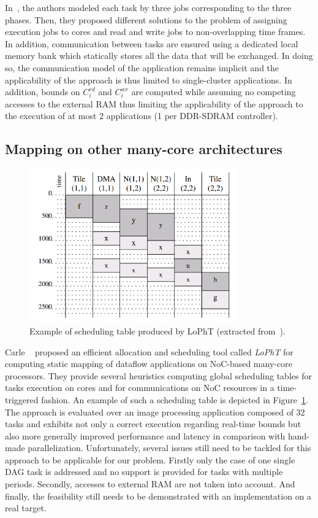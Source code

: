 \documentclass[main.tex]{subfiles}
\begin{document}
In~\cite{Becker16}, the authors modeled each task by three jobs corresponding
to the three phases. Then, they proposed different solutions to the problem of
assigning execution jobs to cores and read and write jobs to non-overlapping
time frames. In addition, communication between tasks are ensured using a
dedicated local memory bank which statically stores all the data that will be
exchanged. In doing so, the communication model of the application remains
implicit and the  applicability of the approach is thus limited to
single-cluster applications. In addition, bounds on $C_i^{rd}$ and $C_i^{wr}$
are computed while assuming no competing accesses to the external RAM thus
limiting the applicability of the approach to the execution of at most 2
applications (1 per DDR-SDRAM controller). 



\subsection{Mapping on other many-core architectures}

\begin{figure}
    \centering
    \includegraphics[width=9cm]{imgs/png/stateOfTheArt_2_LoPhTschedTable.png}
    \caption{Example of scheduling table produced by LoPhT (extracted
    from~\cite{Carle2014}).}
    \label{fig_stateOfTheArt_2_LoPhTschedTable}
\end{figure}

Carle \etal~\cite{Carle2014} proposed an efficient allocation and scheduling
tool called \emph{LoPhT} for computing static mapping of dataflow applications
on NoC-based many-core processors. They provide several heuristics computing
global scheduling tables for tasks execution on cores and for communications on
NoC resources in a time-triggered fashion. An example of such a scheduling
table is depicted in Figure~\ref{fig_stateOfTheArt_2_LoPhTschedTable}. The
approach is evaluated over an image processing application composed of 32 tasks
and exhibits not only a correct execution regarding real-time bounds but also
more generally improved performance and latency in comparison with hand-made
parallelization. Unfortunately, several issues still need to be tackled for
this approach to be applicable for our problem. Firstly only the case of one
single DAG task is addressed and no support is provided for tasks with multiple
periods. Secondly, accesses to external RAM are not taken into account. And
finally, the feasibility still needs to be demonstrated with an implementation
on a real target.\\ 
\end{document}
